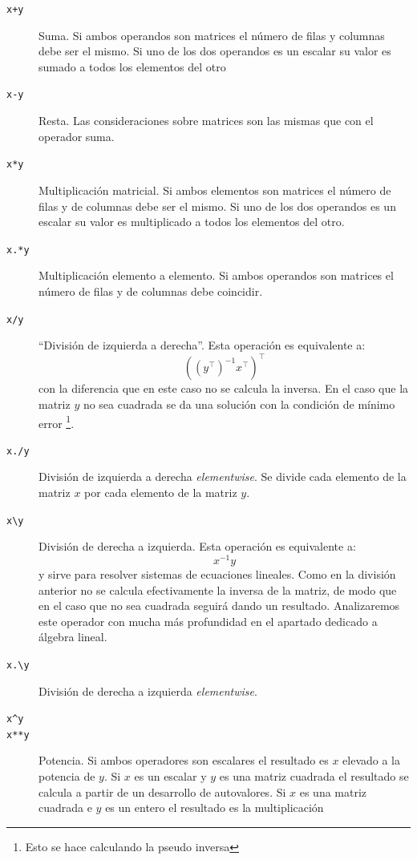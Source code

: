 \begin{description}
\item [\texttt{x+y}]Suma. Si ambos operandos son matrices
  el número de filas y columnas debe ser el mismo. Si uno de los dos
  operandos es un escalar su valor es sumado a todos los elementos del
  otro
\item [\texttt{x-y}]Resta. Las consideraciones sobre
  matrices son las mismas que con el operador suma.
\item [\texttt{x{*}y}]Multiplicación matricial.
  Si ambos elementos son matrices el número de filas y de columnas
  debe ser el mismo. Si uno de los dos operandos es un escalar su
  valor es multiplicado a todos los elementos del otro.
\item [\texttt{x.{*}y}]Multiplicación elemento a elemento. Si ambos
  operandos son matrices el número de filas y de columnas debe
  coincidir.
\item [\texttt{x/y}]{}``División de izquierda a derecha''. Esta
  operación es equivalente a:$$
  \left((y^{\top})^{-1}x^{\top}\right)^{\top}$$ con la diferencia que
  en este caso no se calcula la inversa. En el caso que la matriz $y$
  no sea cuadrada se da una solución con la condición de mínimo error%
  \footnote{Esto se hace calculando la pseudo inversa%
  }.
\item [\texttt{x./y}]División de izquierda a derecha
  \emph{elementwise}.  Se divide cada elemento de la matriz $x$ por
  cada elemento de la matriz $y$.
\item [\texttt{x\textbackslash{}y}] División de derecha a izquierda.
  Esta operación es equivalente a:$$ x^{-1}y$$ y sirve para resolver
  sistemas de ecuaciones lineales. Como en la división anterior no se
  calcula efectivamente la inversa de la matriz, de modo que en el
  caso que no sea cuadrada seguirá dando un resultado.  Analizaremos
  este operador con mucha más profundidad en el apartado dedicado a
  álgebra lineal.
\item [\texttt{x.\textbackslash{}y}] División de derecha a izquierda
  \emph{elementwise}.
\item [\texttt{x\textasciicircum{}y}]
\item [\texttt{x{*}{*}y}]Potencia. Si ambos operadores
  son escalares el resultado es $x$ elevado a la potencia de $y$.  Si
  $x$ es un escalar y $y$ es una matriz cuadrada el resultado se
  calcula a partir de un desarrollo de autovalores. Si $x$ es una
  matriz cuadrada e $y$ es un entero el resultado es la multiplicación

\end{description}
